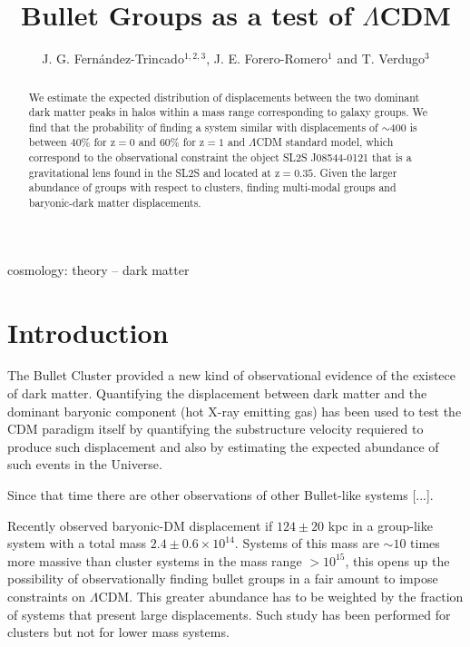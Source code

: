 \documentclass{emulateapj}
\newcommand{\hkpc}{{\ifmmode{h^{-1}{\rm kpc}}\else{$h^{-1}$kpc }\fi}}
\newcommand{\hMsun}{{\ifmmode{h^{-1}{\rm {M_{\odot}}}}\else{$h^{-1}{\rm{M_{\odot}}}$}\fi}}
\newcommand{\Msun}{{\ifmmode{{\rm {M_{\odot}}}}\else{${\rm{M_{\odot}}}$}\fi}}
\begin{document}
 

\title{Bullet Groups as a test of $\Lambda$CDM}
\author{J. G. Fern\'andez-Trincado$^{1,2,3}$, J. E. Forero-Romero$^1$
  and T. Verdugo$^3$} 

\begin{abstract}

We estimate the expected distribution of displacements between the two
dominant dark matter peaks in halos within a mass range corresponding
to galaxy groups. We find that the probability of finding a system
similar with displacements of $\sim$400 \hkpc is between 40\%
for z$=0$ and 60\% for z$=1$ and $\Lambda$CDM standard model, which
correspond to the observational constraint the object SL2S J08544-0121
that is  a gravitational lens found in the SL2S and located at
z$=0.35$. Given the larger abundance of groups with respect to
clusters, finding multi-modal groups and baryonic-dark matter
displacements.  
\end{abstract}

\begin{keywords}
{cosmology: theory -- dark matter} 
\end{keywords}

\section{Introduction}


The Bullet Cluster provided a new kind of observational evidence of
the existece of dark matter. Quantifying the displacement between dark
matter and the dominant baryonic component (hot X-ray emitting gas)
has been used to test the CDM paradigm itself by quantifying the
substructure velocity requiered to produce such displacement and also
by estimating the expected abundance of such events in the Universe.

Since that time there are other observations of other Bullet-like
systems [...].

Recently \citep{Gastaldello} observed baryonic-DM displacement if
$124\pm 20$ kpc in a group-like system with a total mass $2.4\pm 0.6
\times 10^{14}$\Msun. Systems of this mass are $\sim 10$ times more massive
than cluster systems in the mass range $>10^{15}$\hMsun, this opens
up the possibility of observationally finding bullet groups in a fair
amount to impose constraints on $\Lambda$CDM. This greater abundance
has to be weighted by the fraction of systems that present large
displacements. Such study has been performed for clusters but not for
lower mass systems.
\end{document}
